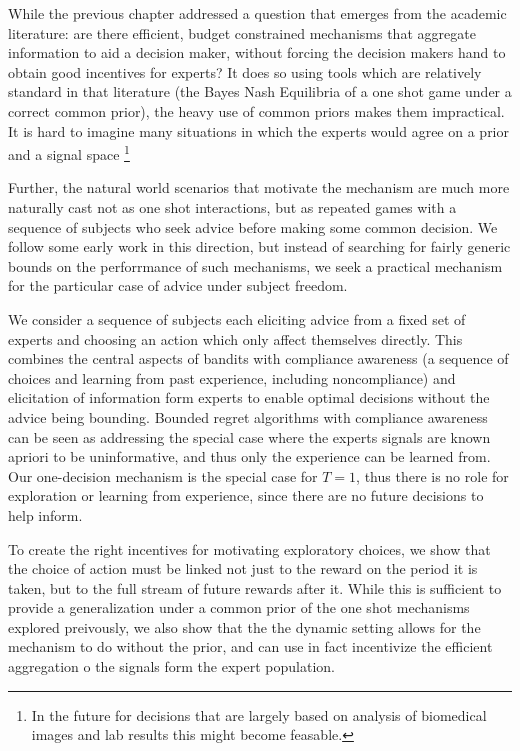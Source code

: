 

While the previous chapter addressed a question that emerges from the academic literature: are there efficient, budget constrained mechanisms that aggregate information to aid a decision maker, without forcing the decision makers hand to obtain good incentives for experts? It does so using tools which are relatively standard in that literature (the Bayes Nash Equilibria of a one shot game under a correct common prior), the heavy use of common priors makes them impractical. It is hard to imagine many situations in which the experts would agree on a prior and a signal space \footnote{In the future for decisions that are largely based on analysis of biomedical images and lab results this might become feasable.}

Further, the natural world scenarios that motivate the mechanism are much more naturally cast not as one shot interactions, but as repeated games with a sequence of subjects who seek advice before making some common decision. 
We follow some early work in this direction, but instead of searching for fairly generic bounds on the perforrmance of such mechanisms, we seek a practical mechanism for the particular case of advice under subject freedom.

We consider a sequence of subjects each eliciting advice from a fixed set of experts and choosing an action which only affect themselves directly. This combines the central aspects of bandits with compliance awareness (a sequence of choices and learning from past experience, including noncompliance) and elicitation of information form experts to enable optimal decisions without the advice being bounding. 
Bounded regret algorithms with compliance awareness can be seen as addressing the special case where the experts signals are known apriori to be uninformative, and thus only the experience can be learned from. Our one-decision mechanism is the special case for $T={1}$, thus there is no role for exploration or learning from experience, since there are no future decisions  to help inform.


To create the right incentives for motivating exploratory choices, we show that the choice of action must be linked not just to the reward on the period it is taken, but to the full stream of future rewards after it. While this is sufficient to provide a generalization under a common prior of the one shot mechanisms explored preivously, we also show that the the dynamic setting allows for the mechanism to do without the prior, and can use in fact incentivize the efficient aggregation o the signals form the expert population.  


